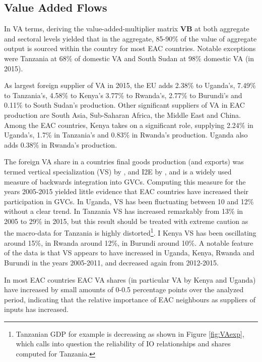 \documentclass[a4paper]{article}
\begin{document}
\subsection{Value Added Flows}

In VA terms, deriving the value-added-multiplier matrix \textbf{VB} at both aggregate and sectoral levels yielded that in the aggregate, 85-90\% of the value of aggregate output is sourced within the country for most EAC countries. Notable exceptions were Tanzania at 68\% of domestic VA and South Sudan at 98\% domestic VA (in 2015). \newline

As largest foreign supplier of VA in 2015, the EU adds 2.38\% to Uganda's, 7.49\% to Tanzania's, 4.58\% to Kenya's 3.77\% to Rwanda's, 2.77\% to Burundi's and 0.11\% to South Sudan's production. Other significant suppliers of VA in EAC production are South Asia, Sub-Saharan Africa, the Middle East and China. Among the EAC countries, Kenya takes on a significant role, supplying 2.24\% in Uganda's, 1.7\% in Tanzania's and 0.83\% in Rwanda's production. Uganda also adds 0.38\% in Rwanda's production. \newline

The foreign VA share in a countries final goods production (and exports) was termed vertical specialization (VS) by \citet{hummels2001nature}, and I2E by \citet{baldwin2015supply}, and is a widely used measure of backwards integration into GVCs. Computing this measure for the years 2005-2015 yielded little evidence that EAC countries have increased their participation in GVCs. In Uganda, VS has been fluctuating between 10 and 12\% without a clear trend. In Tanzania VS has increased remarkably from 13\% in 2005 to 29\% in 2015, but this result should be treated with extreme caution as the macro-data for Tanzania is highly distorted\footnote{Tanzanian GDP for example is decreasing as shown in Figure \ref{fig:VAexp}, which calls into question the reliability of IO relationships and shares computed for Tanzania.}. I Kenya VS has been oscillating around 15\%, in Rwanda around 12\%, in Burundi around 10\%. A notable feature of the data is that VS appears to have increased in Uganda, Kenya, Rwanda and Burundi in the years 2005-2011, and decreased again from 2012-2015. \newline

In most EAC countries EAC VA shares (in particular VA by Kenya and Uganda) have increased by small amounts of 0-0.5 percentage points over the analyzed period, indicating that the relative importance of EAC neighbours as suppliers of inputs has increased. \newline
\end{document}
